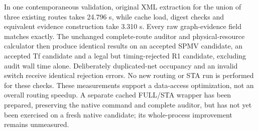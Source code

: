 In one contemporaneous validation, original XML extraction for the union of three existing routes takes 24.796 s, while cache load, digest checks and equivalent evidence construction take 3.310 s. Every raw graph-evidence field matches exactly. The unchanged complete-route auditor and physical-resource calculator then produce identical results on an accepted SPMV candidate, an accepted Tf candidate and a legal but timing-rejected R1 candidate, excluding audit wall time alone. Deliberately duplicated-net occupancy and an invalid switch receive identical rejection errors. No new routing or STA run is performed for these checks. These measurements support a data-access optimization, not an overall routing speedup. A separate cached FULL/STA wrapper has been prepared, preserving the native command and complete auditor, but has not yet been exercised on a fresh native candidate; its whole-process improvement remains unmeasured.
